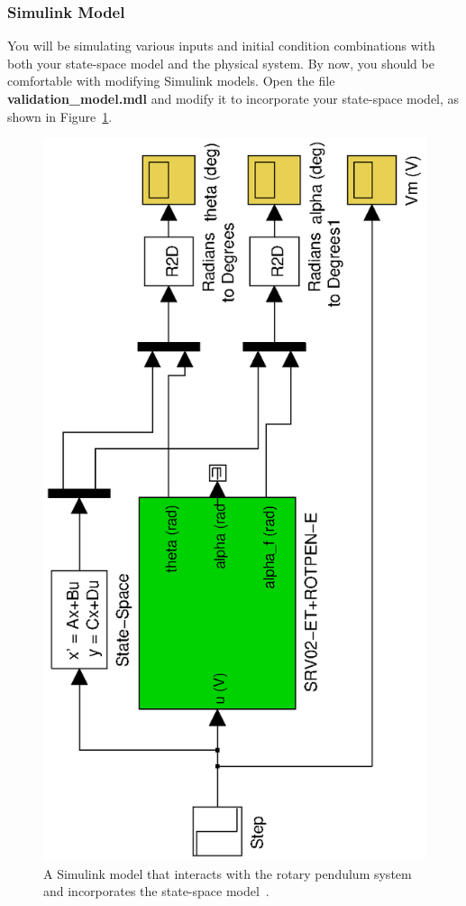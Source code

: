 \documentclass[12pt]{report}
\begin{document}
\subsubsection{Simulink Model}
You will be simulating various inputs and initial condition combinations with both your state-space model and the physical system. By now, you should be comfortable with modifying Simulink models. Open the file \textbf{validation\_model.mdl} and modify it to incorporate your state-space model, as shown in Figure~\ref{fig:lab2_simulink_model}.
\begin{figure}[htb!]
    \centering
    \includegraphics[width=.4\linewidth, angle=270]{eps/lab_2/simulink_model.eps}
    \caption{A Simulink model that interacts with the rotary pendulum system and incorporates the state-space model~\cite{Q-Flex-Beam}.}
    \label{fig:lab2_simulink_model}
\end{figure}
\end{document}
